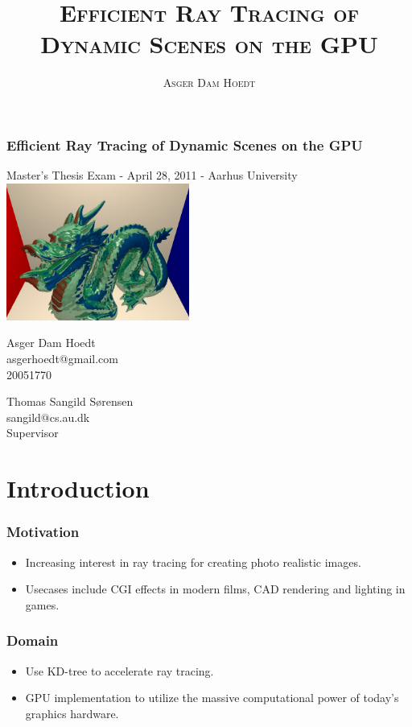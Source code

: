 \documentclass{beamer}
\author{\textsc{Asger Dam Hoedt}}
\title{\textsc{Efficient Ray Tracing of Dynamic Scenes on the GPU}}
\begin{document}

\begin{frame}
  \begin{center}
    \frametitle{Efficient Ray Tracing of Dynamic Scenes on the GPU}
    \footnotesize
    Master's Thesis Exam - April 28, 2011 - Aarhus University
    \vspace*{15pt}\\
    \includegraphics[width=6cm]{semiReflectingDragon}
    \vspace*{20pt}
    \\
    \begin{minipage}{0.4\textwidth}
      \centering
      Asger Dam Hoedt \\ asgerhoedt@gmail.com \\ 20051770
    \end{minipage}
    \begin{minipage}{0.4\textwidth}
      \centering
      Thomas Sangild Sørensen \\ sangild@cs.au.dk \\ Supervisor
    \end{minipage}
  \end{center}
\end{frame}

\section{Introduction}
\begin{frame}
  \frametitle{Motivation}

  \begin{itemize}
  \item Increasing interest in ray tracing for creating photo realistic images.
  \item Usecases include CGI effects in modern films, CAD rendering and lighting
    in games.
  \end{itemize}
\end{frame}

\begin{frame}
  \frametitle{Domain}
  \begin{itemize}
  \item Use KD-tree to accelerate ray tracing.
  \item GPU implementation to utilize the massive computational power of today's
    graphics hardware.
  \end{itemize}
\end{frame}
\end{document}

